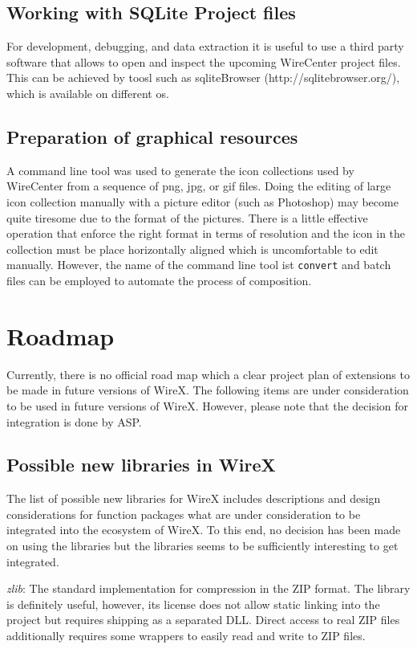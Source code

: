 \documentclass[11pt,a4paper,onepage,openany]{book}
\begin{document}
\section{Working with SQLite Project files}
For development, debugging, and data extraction it is useful to use a third
party software that allows to open and inspect the upcoming WireCenter project
files. This can be achieved by toosl such as sqliteBrowser
(http://sqlitebrowser.org/), which is available on different os.

\section{Preparation of graphical resources}
A command line tool was used to generate the icon collections used by
WireCenter from a sequence of png, jpg, or gif files. Doing the editing of
large icon collection manually with a picture editor (such as Photoshop) may
become quite tiresome due to the format of the pictures. There is a little
effective operation that enforce the right format in terms of resolution and
the icon in the collection must be place horizontally aligned which is
uncomfortable to edit manually. However, the name of the command line tool
ist \texttt{convert} and batch files can be employed to automate the process
of composition.

\chapter{Roadmap}
Currently, there is no official road map which a clear project plan of extensions 
to be made in future versions of WireX. The following items are under consideration
to be used in future versions of WireX. However, please note that the decision
for integration is done by ASP.

\section{Possible new libraries in WireX}
The list of possible new libraries for WireX includes descriptions and design
considerations for function packages what are under consideration to be
integrated into the ecosystem of WireX. To this end, no decision has been made
on using the libraries but the libraries seems to be sufficiently interesting
to get integrated.

\emph{zlib}: The standard implementation for compression in the ZIP format. The
library is definitely useful, however, its license does not allow static
linking into the project but requires shipping as a separated DLL. Direct
access to real ZIP files additionally requires some wrappers to easily read and
write to ZIP files.
\end{document}
